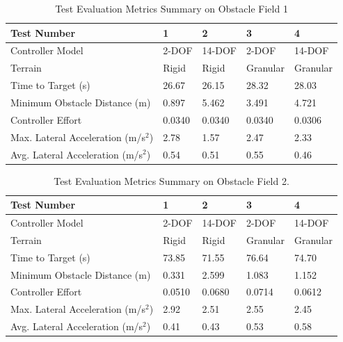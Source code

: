 \documentclass[12pt,twocolumn]{article}
\begin{document}
\begin{table}
		\centering
\begin{tabular}{ ||p{6cm}|p{1.8cm}|p{1.8cm}|p{1.8cm}|p{1.8cm}||  }
		\hline
		Test Number & 1 & 2 & 3 & 4\\
		\hline
		Controller Model & 2-DOF & 14-DOF & 2-DOF & 14-DOF\\
		\hline
		Terrain & Rigid & Rigid & Granular & Granular\\
		\hline
		Time to Target (s)  & 26.67 & 26.15 & 28.32 & 28.03\\ 
		\hline
		Minimum Obstacle Distance (m) & 0.897 & 5.462 & 3.491 & 4.721\\
		\hline
		Controller Effort & 0.0340 & 0.0340 & 0.0340 & 0.0306\\
		\hline
		Max. Lateral Acceleration (m/s$^{2}$)& 2.78 & 1.57 & 2.47 & 2.33 \\
		\hline
		Avg. Lateral Acceleration (m/s$^{2}$) &0.54 & 0.51 & 0.55 & 0.46\\
		\hline
\end{tabular}
\caption{Test Evaluation Metrics Summary on Obstacle Field 1}
\label{t:EvalMetricsObst1}
\end{table}

\begin{table}
		\centering
\begin{tabular}{ ||p{6cm}|p{1.8cm}|p{1.8cm}|p{1.8cm}|p{1.8cm}||  }
		\hline
		Test Number & 1 & 2 & 3 & 4\\
		\hline
		Controller Model & 2-DOF & 14-DOF & 2-DOF & 14-DOF\\
		\hline
		Terrain & Rigid & Rigid & Granular & Granular\\
		\hline
		Time to Target (s)  & 73.85 & 71.55 & 76.64 & 74.70\\ 
		\hline
		Minimum Obstacle Distance (m) & 0.331 & 2.599 & 1.083 & 1.152\\
		\hline
		Controller Effort & 0.0510 & 0.0680 & 0.0714 & 0.0612\\
		\hline
		Max. Lateral Acceleration (m/s$^{2}$)& 2.92 & 2.51 & 2.55 & 2.45 \\
		\hline
		Avg. Lateral Acceleration (m/s$^{2}$) & 0.41 & 0.43 & 0.53 & 0.58\\
		\hline
\end{tabular}
\caption{Test Evaluation Metrics Summary on Obstacle Field 2.}
\label{t:EvalMetricsObst2}
\end{table}
\end{document}
